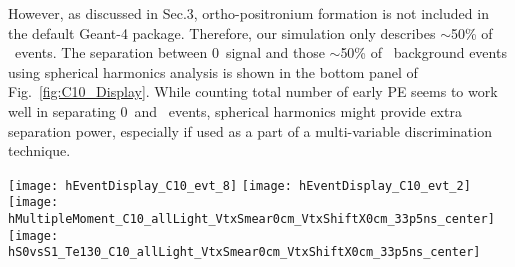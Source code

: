 However, as discussed in Sec.3, ortho-positronium formation is not included in the default Geant-4 package. Therefore, our simulation only 
describes $\sim$50\% of \C~events. The separation between 0\nbb~signal and those $\sim$50\% of \C~background events using spherical harmonics 
analysis is shown in the bottom panel of Fig.~\ref{fig:C10_Display}. While counting total number of early PE seems to work well in separating
0\nbb~and \C~events, spherical harmonics might provide extra separation power, especially if used as a part of a multi-variable discrimination 
technique.

\begin{figure*}[h]
  \centering
  \texttt{[image: hEventDisplay\_C10\_evt\_8]}
  \texttt{[image: hEventDisplay\_C10\_evt\_2]}
  \texttt{[image: hMultipleMoment\_C10\_allLight\_VtxSmear0cm\_VtxShiftX0cm\_33p5ns\_center]}
  \texttt{[image: hS0vsS1\_Te130\_C10\_allLight\_VtxSmear0cm\_VtxShiftX0cm\_33p5ns\_center]}
  \caption{\emph{Top panels:} Event displays for \C~events. An example of an event with low number of early PEs (\emph{top left})
    and an example event with complicated topology (\emph{top right}). The default QE and the time cut of 33.5~ns are applied to 
    both Cherenkov (\emph{triangles}) and scintillation (\emph{crosses}) photons.
    \emph{Bottom right panel:} Normalized power spectrum $S_l$ calculated for distribution of all PE after the 33.5~ns time cut.
    {\Te} 0{\nbb}-decay signal (\emph{solid red line}) and {\C} background (\emph{dashed green line}) topologies are compared.
    Simulation of 1000 signal and background events. The normalized power values $S_l$'s were calculated for each individual event.
    The horizontal lines correspond to the mean values of $S_l$. The vertical bars show one standard deviation from the mean value. 
    \emph{Bottom left panel:} Comparison between signal (\emph{red crosses}) and \C~background (\emph{green triangles})
    on a scatter plot of $S_0$ versus $S_1$.}
  \label{fig:C10_Display}
\end{figure*}


